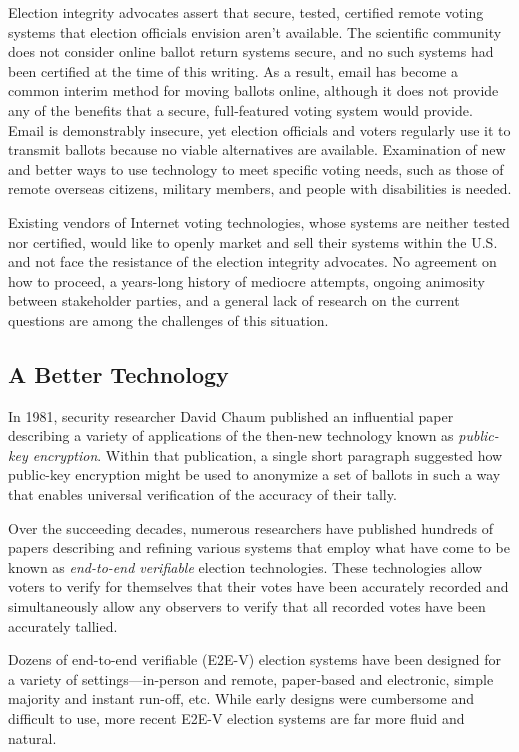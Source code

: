 Election integrity advocates assert that secure, tested, certified
remote voting systems that election officials envision aren’t
available. The scientific community does not consider online ballot
return systems secure, and no such systems had been certified at the
time of this writing. As a result, email has become a common interim
method for moving ballots online, although it does not provide any of
the benefits that a secure, full-featured voting system would provide.
Email is demonstrably insecure, yet election officials and voters
regularly use it to transmit ballots because no viable alternatives are
available. Examination of new and better ways to use technology to
meet specific voting needs, such as those of remote overseas citizens,
military members, and people with disabilities is needed.

Existing vendors of Internet voting technologies, whose systems are
neither tested nor certified, would like to openly market and sell
their systems within the U.S. and not face the resistance of the
election integrity advocates. No agreement on how to proceed, a
years-long history of mediocre attempts, ongoing animosity between
stakeholder parties, and a general lack of research on the current
questions are among the challenges of this situation.

\subsection{A Better Technology}
\label{sec:better-technology}

In 1981, security researcher David Chaum published an influential
paper describing a variety of applications of the then-new technology
known as \emph{public-key encryption}. Within that publication, a single
short paragraph suggested how public-key encryption might be used to
anonymize a set of ballots in such a way that enables universal
verification of the accuracy of their tally.

Over the succeeding decades, numerous researchers have published
hundreds of papers describing and refining various systems that employ
what have come to be known as \emph{end-to-end verifiable} election
technologies. These technologies allow voters to verify for themselves
that their votes have been accurately recorded and simultaneously
allow any observers to verify that all recorded votes have been
accurately tallied.

Dozens of end-to-end verifiable (E2E-V) election systems have been
designed for a variety of settings---in-person and remote, paper-based
and electronic, simple majority and instant run-off, etc. While early
designs were cumbersome and difficult to use, more recent E2E-V
election systems are far more fluid and natural.


